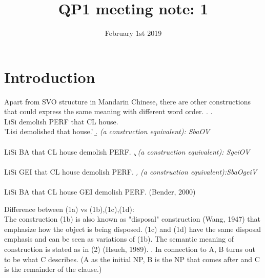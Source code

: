 \documentclass[12pt, oneside]{article}
\title{QP1 meeting note: 1}
\date{February 1st 2019}
\begin{document}
\maketitle

\section{Introduction}
Apart from SVO structure in Mandarin Chinese, there are other constructions that could express the same meaning with different word order. 
\ex. \a.  \\
        LiSi demolish PERF that CL house.\\
        'Lisi demolished that house.'
    \b. \textit{(a  construction equivalent): SbaOV} \\ 
    \\
    LiSi BA that CL house demolish PERF.
    \c. \textit{(a construction equivalent): SgeiOV} \\
    \\
    LiSi GEI that CL house demolish PERF.
    \d. \textit{(a  construction equivalent):SbaOgeiV}\\
    \\
    LiSi BA that CL house GEI demolish PERF. (Bender, 2000)

Difference between (1a) vs (1b),(1c),(1d):\\
The  construction (1b) is also known as "disposal" construction (Wang, 1947) that emphasize how the object is being disposed. (1c) and (1d) have the same disposal emphasis and can be seen as variations of (1b).
The semantic meaning of  construction is stated as in (2) (Hsueh, 1989).
\ex. In connection to A, B turns out to be what C describes. (A as the initial NP, B is the NP that comes after  and C is the remainder of the clause.)
\end{document}
